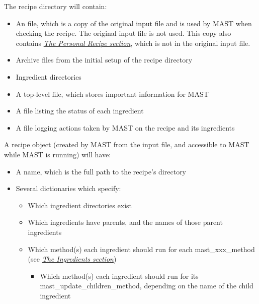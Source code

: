 \documentclass[letterpaper,10pt,english]{sphinxmanual}
\begin{document}
The recipe directory will contain:
\begin{itemize}
\item {} 
An  file, which is a copy of the original input file and is used by MAST when checking the recipe. The original input file is not used. This copy also contains {\hyperref[3_1_4_personalrecipe::doc]{\emph{The Personal Recipe section}}}, which is not in the original input file.

\item {} 
Archive files from the initial setup of the recipe directory

\item {} 
Ingredient directories

\item {} 
A top-level  file, which stores important information for MAST

\item {} 
A  file listing the status of each ingredient

\item {} 
A  file logging actions taken by MAST on the recipe and its ingredients

\end{itemize}

A recipe object (created by MAST from the input file, and accessible to MAST while MAST is running) will have:
\begin{itemize}
\item {} 
A name, which is the full path to the recipe's directory

\item {} 
Several dictionaries which specify:
\begin{itemize}
\item {} 
Which ingredient directories exist

\item {} 
Which ingredients have parents, and the names of those parent ingredients

\item {} 
Which method(s) each ingredient should run for each mast\_xxx\_method (see {\hyperref[3_1_2_ingredients::doc]{\emph{The Ingredients section}}})
\begin{itemize}
\item {} 
Which method(s) each ingredient should run for its mast\_update\_children\_method, depending on the name of the child ingredient

\end{itemize}

\end{itemize}

\end{itemize}
\end{document}
